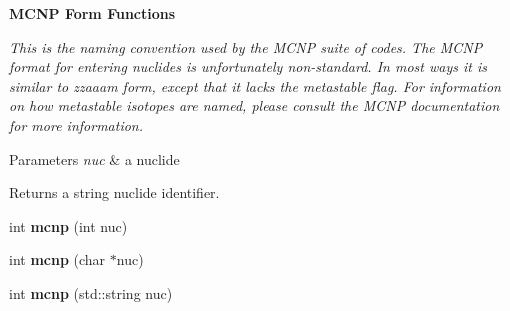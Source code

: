 \begin{Indent}{\bf M\+C\+N\+P Form Functions}\par
{\em This is the naming convention used by the M\+C\+N\+P suite of codes. The M\+C\+N\+P format for entering nuclides is unfortunately non-\/standard. In most ways it is similar to zzaaam form, except that it lacks the metastable flag. For information on how metastable isotopes are named, please consult the M\+C\+N\+P documentation for more information. 
\begin{DoxyParams}{Parameters}
{\em nuc} & a nuclide \\
\hline
\end{DoxyParams}
\begin{DoxyReturn}{Returns}
a string nuclide identifier. 
\end{DoxyReturn}
}\begin{DoxyCompactItemize}
\item 
\hypertarget{namespacepyne_1_1nucname_a9b336037f24de5fb0a9f24bc6324cd40}{int {\bfseries mcnp} (int nuc)}\label{namespacepyne_1_1nucname_a9b336037f24de5fb0a9f24bc6324cd40}

\item 
\hypertarget{namespacepyne_1_1nucname_aee1f14debc9a04463ec1c3443dbdf4ba}{int {\bfseries mcnp} (char $\ast$nuc)}\label{namespacepyne_1_1nucname_aee1f14debc9a04463ec1c3443dbdf4ba}

\item 
\hypertarget{namespacepyne_1_1nucname_a3e05db49bed60a40e56a1798afcd33ea}{int {\bfseries mcnp} (std\+::string nuc)}\label{namespacepyne_1_1nucname_a3e05db49bed60a40e56a1798afcd33ea}

\end{DoxyCompactItemize}
\end{Indent}
